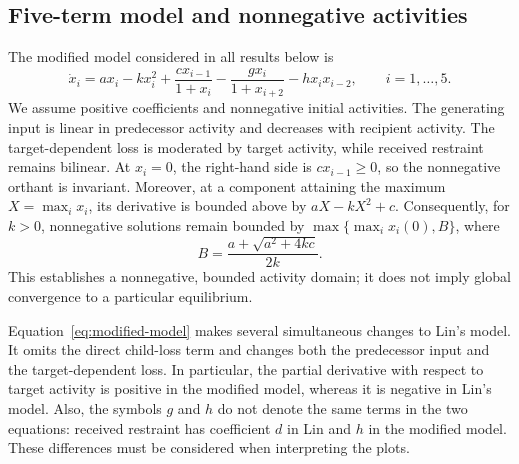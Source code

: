 \documentclass{article}
\begin{document}
\subsection{Five-term model and nonnegative activities}
The modified model considered in all results below is
\begin{equation}
 \dot x_i=a x_i-kx_i^2+\frac{c x_{i-1}}{1+x_i}
                  -\frac{g x_i}{1+x_{i+2}}-h x_i x_{i-2},
 \qquad i=1,\ldots,5.
 \label{eq:modified-model}
\end{equation}
We assume positive coefficients and nonnegative initial activities.
The generating input is linear in predecessor activity and decreases with
recipient activity. The target-dependent loss is moderated by target
activity, while received restraint remains bilinear.
At $x_i=0$, the right-hand side is $c x_{i-1}\geq0$, so the nonnegative
orthant is invariant. Moreover, at a component attaining the maximum
$X=\max_i x_i$, its derivative is bounded above by
$aX-kX^2+c$. Consequently, for $k>0$, nonnegative solutions remain bounded
by $\max\{\max_i x_i(0),B\}$, where
\begin{equation}
 B=\frac{a+\sqrt{a^2+4kc}}{2k}.
\end{equation}
This establishes a nonnegative, bounded activity domain; it does not imply
global convergence to a particular equilibrium.

Equation~\eqref{eq:modified-model} makes several simultaneous changes to
Lin's model. It omits the direct child-loss term and changes both the
predecessor input and the target-dependent loss. In particular, the
partial derivative with respect to target activity is positive in the
modified model, whereas it is negative in Lin's model. Also, the symbols
$g$ and $h$ do not denote the same terms in the two equations:
received restraint has coefficient $d$ in Lin and $h$ in the modified
model. These differences must be considered when interpreting the plots.
\end{document}
